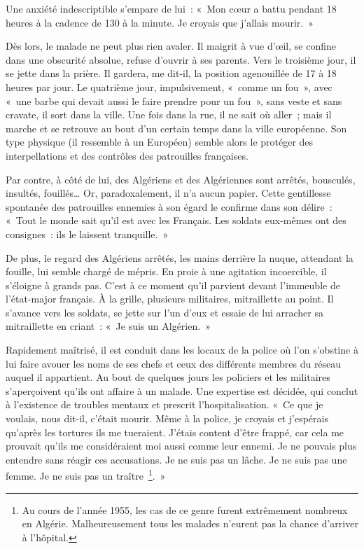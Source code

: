 \documentclass[french,twoside]{book} %
\begin{document}
Une anxiété indescriptible s’empare de lui : « Mon cœur a battu pendant 18 heures à la cadence de 130 à la minute. Je croyais que j’allais mourir. »\par
 Dès lors, le malade ne peut plus rien avaler. Il maigrit à vue d’œil, se confine dans une obscurité absolue, refuse d’ouvrir à ses parents. Vers le troisième jour, il se jette dans la prière. Il gardera, me dit-il, la position agenouillée de 17 à 18 heures par jour. Le quatrième jour, impulsivement, « comme un fou », avec « une barbe qui devait aussi le faire prendre pour un fou », sans veste et sans cravate, il sort dans la ville. Une fois dans la rue, il ne sait où aller ; mais il marche et se retrouve au bout d’un certain temps dans la ville européenne. Son type physique (il ressemble à un Européen) semble alors le protéger des interpellations et des contrôles des patrouilles françaises.\par
Par contre, à côté de lui, des Algériens et des Algériennes sont arrêtés, bousculés, insultés, fouillés… Or, paradoxalement, il n’a aucun papier. Cette gentillesse spontanée des patrouilles ennemies à son égard le confirme dans son délire : « Tout le monde sait qu’il est avec les Français. Les soldats eux-mêmes ont des consignes : ils le laissent tranquille. »\par
De plus, le regard des Algériens arrêtés, les mains derrière la nuque, attendant la fouille, lui semble chargé de mépris. En proie à une agitation incoercible, il s’éloigne à grands pas. C’est à ce moment qu’il parvient devant l’immeuble de l’état-major français. À la grille, plusieurs militaires, mitraillette au point. Il s’avance vers les soldats, se jette sur l’un d’eux et essaie de lui arracher sa mitraillette en criant : « Je suis un Algérien. »\par
Rapidement maîtrisé, il est conduit dans les locaux de la police où l’on s’obstine à lui faire avouer les noms de ses chefs et ceux des différents membres du réseau auquel il appartient. Au bout de quelques jours les policiers et les militaires s’aperçoivent qu’ils ont affaire à un malade. Une expertise est décidée, qui conclut à l’existence de troubles mentaux et prescrit l’hospitalisation. « Ce que je voulais, nous dit-il, c’était mourir. Même à la police, je croyais et j’espérais qu’après les tortures ils me tueraient. J’étais content d’être frappé, car cela me prouvait qu’ils me considéraient moi aussi comme leur ennemi. Je ne pouvais plus entendre sans réagir ces accusations. Je ne suis   pas un lâche. Je ne suis pas une femme. Je ne suis pas un traître \footnote{Au cours de l’année 1955, les cas de ce genre furent extrêmement nombreux en Algérie. Malheureusement tous les malades n’eurent pas la chance d’arriver à l’hôpital.}. »
\end{document}
